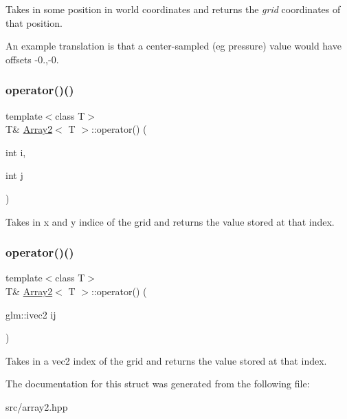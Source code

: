 Takes in some position in world coordinates and returns the {\itshape grid} coordinates of that position. 

An example translation is that a center-\/sampled (eg pressure) value would have offsets -\/0.,-\/0. \mbox{\label{structArray2_a8a89f0623dc0e116e4dc14b0b77b769e}} 
\subsubsection{\texorpdfstring{operator()()}{operator()()}\hspace{0.1cm}{\footnotesize\ttfamily [1/2]}}
{\footnotesize\ttfamily template$<$class T$>$ \\
T\& \mbox{\hyperlink{structArray2}{Array2}}$<$ T $>$\+::operator() (\begin{DoxyParamCaption}\item[{int}]{i,  }\item[{int}]{j }\end{DoxyParamCaption})\hspace{0.3cm}{\ttfamily [inline]}}



Takes in x and y indice of the grid and returns the value stored at that index. 

\mbox{\label{structArray2_a3e1321aba8d5072af7fcffe56198b99d}} 
\subsubsection{\texorpdfstring{operator()()}{operator()()}\hspace{0.1cm}{\footnotesize\ttfamily [2/2]}}
{\footnotesize\ttfamily template$<$class T$>$ \\
T\& \mbox{\hyperlink{structArray2}{Array2}}$<$ T $>$\+::operator() (\begin{DoxyParamCaption}\item[{glm\+::ivec2}]{ij }\end{DoxyParamCaption})\hspace{0.3cm}{\ttfamily [inline]}}



Takes in a vec2 index of the grid and returns the value stored at that index. 



The documentation for this struct was generated from the following file\+:\begin{DoxyCompactItemize}
\item 
src/array2.\+hpp\end{DoxyCompactItemize}

